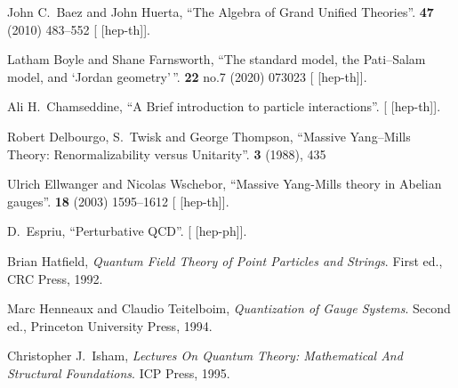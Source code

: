 \begin{thebibliography}{99}

John C.~Baez and John Huerta,
``The Algebra of Grand Unified Theories''.
 \textbf{47} (2010) 483--552
{\tt{}}
[ [hep-th]].
  
Latham Boyle and Shane Farnsworth,
``The standard model, the Pati--Salam model, and `Jordan geometry'\,''.
 \textbf{22} no.7 (2020) 073023
{\tt{}}
[ [hep-th]].

Ali H.~Chamseddine,
``A Brief introduction to particle interactions''.
[ [hep-th]].

Robert Delbourgo, S.~Twisk and George Thompson,
``Massive Yang--Mills Theory: Renormalizability versus Unitarity''.
 \textbf{3} (1988), 435
{\tt{}}

Ulrich Ellwanger and Nicolas Wschebor,
``Massive Yang-Mills theory in Abelian gauges''.
 \textbf{18} (2003) 1595--1612
{\tt{}}
[ [hep-th]].

D.~Espriu,
``Perturbative QCD''.
[ [hep-ph]].

Brian Hatfield,
\textit{Quantum Field Theory of Point Particles and Strings}.
First ed., CRC Press, 1992.

Marc Henneaux and Claudio Teitelboim,
\textit{Quantization of Gauge Systems}.
Second ed., Princeton University Press, 1994.

Christopher J.\ Isham,
\textit{Lectures On Quantum Theory: Mathematical And Structural Foundations}.
ICP Press, 1995.


\end{thebibliography}
